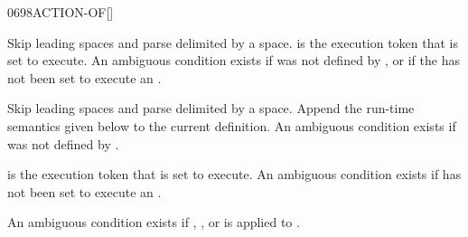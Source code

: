 \vspace*{-1ex}
\begin{worddef}{0698}{ACTION-OF}[]%
\interpret

	Skip leading spaces and parse  delimited by a space.
	 is the execution token that  is set to execute.
	An ambiguous condition exists if  was not defined by
	, or if the  has not been set to execute an
	.

\compile

	Skip leading spaces and parse  delimited by a space.
	Append the run-time semantics given below to the current
	definition.  An ambiguous condition exists if 
	was not defined by .

\runtime

	 is the execution token that  is set to execute.
	An ambiguous condition exists if  has not been
	set to execute an .

	An ambiguous condition exists if , \word{[COMPILE]},
	\word{[']} or  is applied to .


	\begin{implement} %
		\word{:}  \\
		\tab {}   \\
		\tab[2]  \word{[']}   \\
		\tab {} \\
		\tab[2]   \\
		\tab {} \word{;} 
	\end{implement}

	\begin{testing} %
		 \\

		 \\
		 \\
		 \\

		 \\
		 \\
		 \\
	\end{testing}
\end{worddef}


